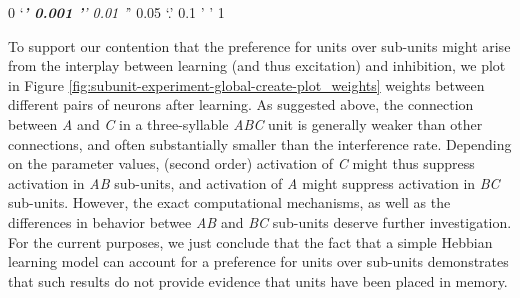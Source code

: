 \documentclass[
]{article}
\begin{document}
0 `\emph{\textbf{' 0.001 '}' 0.01 '}' 0.05 `.' 0.1 ' ' 1

To support our contention that the preference for units over sub-units
might arise from the interplay between learning (and thus excitation)
and inhibition, we plot in Figure
\ref{fig:subunit-experiment-global-create-plot_weights} weights between
different pairs of neurons after learning. As suggested above, the
connection between \emph{A} and \emph{C} in a three-syllable \emph{ABC}
unit is generally weaker than other connections, and often substantially
smaller than the interference rate. Depending on the parameter values,
(second order) activation of \emph{C} might thus suppress activation in
\emph{AB} sub-units, and activation of \emph{A} might suppress
activation in \emph{BC} sub-units. However, the exact computational
mechanisms, as well as the differences in behavior betwee \emph{AB} and
\emph{BC} sub-units deserve further investigation. For the current
purposes, we just conclude that the fact that a simple Hebbian learning
model can account for a preference for units over sub-units demonstrates
that such results do not provide evidence that units have been placed in
memory.
\end{document}
